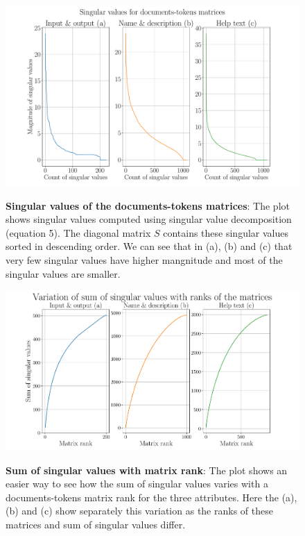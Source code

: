\begin{figure}[h]
\begin{centering}
    {\includegraphics[scale=0.35]{figures/Singular_values.pdf}}
    \caption[Singular values of documents-tokens matrices]{\textbf{Singular values of the documents-tokens matrices}: The plot shows singular values computed using singular value decomposition (equation 5). The diagonal matrix $S$ contains these singular values sorted in descending order. We can see that in (a), (b) and (c) that very few singular values have higher mangnitude and most of the singular values are smaller.}
\end{centering}
\end{figure}

\begin{figure}[h]
\begin{centering}
    {\includegraphics[scale=0.45]{figures/Sum_singular_ranks.pdf}}
    \caption[Singular values of documents-tokens matrices with their respective ranks]{\textbf{Sum of singular values with matrix rank}: The plot shows an easier way to see how the sum of singular values varies with a documents-tokens matrix rank for the three attributes. Here the (a), (b) and (c) show separately this variation as the ranks of these matrices and sum of singular values differ.}
\end{centering}
\end{figure}

